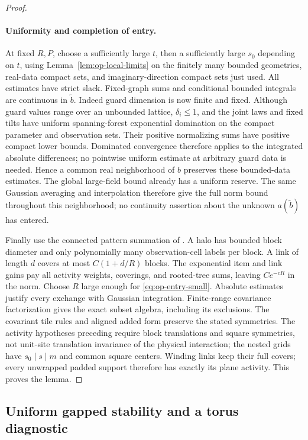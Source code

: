 \begin{proof}
\paragraph{Uniformity and completion of entry.}
At fixed \(R,P\), choose a sufficiently large \(t\),
then a sufficiently large \(s_0\) depending on \(t\),
using Lemma~\ref{lem:op-local-limits} on the finitely
many bounded geometries, real-data compact sets, and
imaginary-direction compact sets just used.  All
estimates have strict slack.  Fixed-graph sums and
conditional bounded integrals are continuous in
\(\widetilde b\).  Indeed guard dimension is now
finite and fixed.  Although guard values range over
an unbounded lattice, \(\delta_i\leq1\), and the joint
laws and fixed tilts have uniform spanning-forest
exponential domination on the compact parameter and
observation sets.  Their positive normalizing sums
have positive compact lower bounds.  Dominated
convergence therefore applies to the integrated
absolute differences; no pointwise uniform estimate
at arbitrary guard data is needed.  Hence a
common real neighborhood of \(b\) preserves these
bounded-data estimates.  The global large-field
bound already has a uniform reserve.  The same
Gaussian averaging and interpolation therefore give
the full norm bound throughout this neighborhood;
no continuity assertion about the unknown \(a(\widetilde b)\)
has entered.

Finally use the connected pattern summation of
.  A halo has bounded block
diameter and only polynomially many observation-cell
labels per block.  A link of length \(d\) covers
at most \(C(1+d/R)\) blocks.  The exponential item
and link gains pay all activity weights, coverings,
and rooted-tree sums, leaving \(Ce^{-cR}\) in the
norm.  Choose \(R\) large enough for
\eqref{eq:op-entry-small}.  Absolute estimates
justify every exchange with Gaussian integration.
Finite-range covariance factorization gives the
exact subset algebra, including its exclusions.
The covariant tile rules and aligned added form
preserve the stated symmetries.  The activity hypotheses
preceding  require block translations
and square symmetries, not unit-site translation
invariance of the physical interaction; the nested
grids have \(s_0\mid s\mid m\) and common square
centers.  Winding links keep
their full covers; every unwrapped padded support
therefore has exactly its plane activity.  This
proves the lemma.
\end{proof}

\subsection{Uniform gapped stability and a torus diagnostic}

